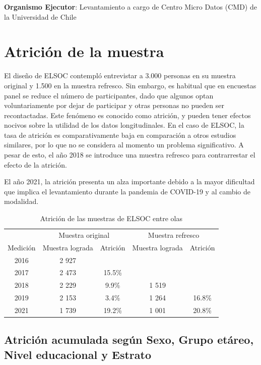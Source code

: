 \documentclass[
  12pt,
]{book}
\begin{document}
\textbf{Organismo Ejecutor}: Levantamiento a cargo de Centro Micro Datos (CMD) de la Universidad de Chile

\hypertarget{atriciuxf3n-de-la-muestra}{%
\section{Atrición de la muestra}\label{atriciuxf3n-de-la-muestra}}

El diseño de ELSOC contempló entrevistar a 3.000 personas en su muestra original y 1.500 en la muestra refresco. Sin embargo, es habitual que en encuestas panel se reduce el número de participantes, dado que algunos optan voluntariamente por dejar de participar y otras personas no pueden ser recontactadas. Este fenómeno es conocido como atrición, y pueden tener efectos nocivos sobre la utilidad de los datos longitudinales. En el caso de ELSOC, la tasa de atrición es comparativamente baja en comparación a otros estudios similares, por lo que no se considera al momento un problema significativo. A pesar de esto, el año 2018 se introduce una muestra refresco para contrarrestar el efecto de la atrición.

El año 2021, la atrición presenta un alza importante debido a la mayor dificultad que implica el levantamiento durante la pandemia de COVID-19 y al cambio de modalidad.

\begin{table}

\caption{\label{tab:tabla-atricion}Atrición de las muestras de ELSOC entre olas}
\centering
\begin{tabular}[t]{c|c|c|c|c}
\hline
\multicolumn{1}{c|}{ } & \multicolumn{2}{c|}{Muestra original} & \multicolumn{2}{c}{Muestra refresco} \\
\cline{2-3} \cline{4-5}
Medición & Muestra lograda & Atrición & Muestra lograda & Atrición\\
\hline
2016 & 2 927 &  &  & \\
\hline
2017 & 2 473 & 15.5\% &  & \\
\hline
2018 & 2 229 & 9.9\% & 1 519 & \\
\hline
2019 & 2 153 & 3.4\% & 1 264 & 16.8\%\\
\hline
2021 & 1 739 & 19.2\% & 1 001 & 20.8\%\\
\hline
\end{tabular}
\end{table}

\hypertarget{atriciuxf3n-acumulada-seguxfan-sexo-grupo-etuxe1reo-nivel-educacional-y-estrato}{%
\subsection*{Atrición acumulada según Sexo, Grupo etáreo, Nivel educacional y Estrato}\label{atriciuxf3n-acumulada-seguxfan-sexo-grupo-etuxe1reo-nivel-educacional-y-estrato}}
\end{document}
